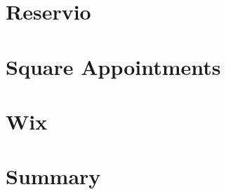 \section{Reservio}
\label{part:reservio}



\section{Square Appointments}
\label{part:square_appointments}



\section{Wix}
\label{part:wix}



\section{Summary}
\label{part:existing_reservation_systems_summary}


